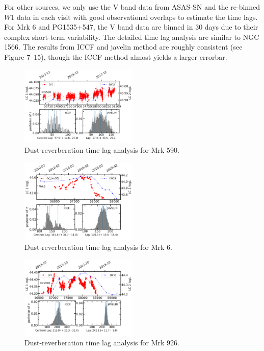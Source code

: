 For other sources, we only use the V band data from ASAS-SN and the re-binned $W1$ data in each visit with good observational overlaps to estimate the time lags. For Mrk 6 and PG1535+547, the V band data are binned in 30 days due to their complex short-term variability. The detailed time lag analysis are similar to NGC 1566. The results from ICCF and {\sc javelin} method are roughly consistent (see Figure 7--15), though the ICCF method almost yields a larger errorbar. 


\begin{figure}
\centering
	\includegraphics[width=0.5\textwidth]{pic/Mrk590lag.png}
    \caption{Dust-reverberation time lag analysis for Mrk 590. }
    \label{fig:lag_Mrk590}
\end{figure}
\begin{figure}
\centering
	\includegraphics[width=0.5\textwidth]{pic/Mrk6lag1.png}
    \caption{Dust-reverberation time lag analysis for Mrk 6. }
    \label{fig:lag_Mrk6}
\end{figure}
\begin{figure}
\centering
	\includegraphics[width=0.5\textwidth]{pic/Mrk926lag.png}
    \caption{Dust-reverberation time lag analysis for Mrk 926. }
    \label{fig:lag_Mrk926}
\end{figure}




